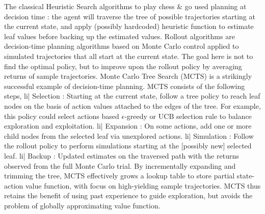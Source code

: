 The classical Heuristic Search algorithms to play chess & go used planning at decision time : the agent will traverse the tree of possible trajectories starting at the current state, and apply (possibly hardcoded) heuristic function to estimate leaf values before backing up the estimated values.
Rollout algorithms are decision-time planning algorithms based on Monte Carlo control applied to simulated trajectories that all start at the current state. The goal here is not to find the optimal policy, but to improve upon the rollout policy by averaging returns of sample trajectories.
Monte Carlo Tree Search (MCTS) is a strikingly successful example of decision-time planning. MCTS consists of the following steps,
li| Selection : Starting at the current state, follow a tree policy to reach leaf nodes on the basis of action values attached to the edges of the tree. For example, this policy could select actions based \( \epsilon \)-greedy or UCB selection rule to balance exploration and exploitation.
li| Expansion : On some actions, add one or more child nodes from the selected leaf via unexplored actions.
li| Simulation : Follow the rollout policy to perform simulations starting at the [possibly new] selected leaf.
li| Backup : Updated estimates on the traversed path with the returns observed from the full Monte Carlo trial.
By incrementally expanding and trimming the tree, MCTS effectively grows a lookup table to store partial state-action value function, with focus on high-yielding sample trajectories. MCTS thus retains the benefit of using past experience to guide exploration, but avoids the problem of globally approximating value function.